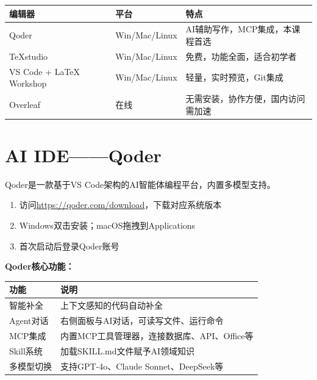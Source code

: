 \begin{table}[H]
\centering
\begin{tabular}{llp{6cm}}
\toprule
\textbf{编辑器} & \textbf{平台} & \textbf{特点} \\
\midrule
Qoder & Win/Mac/Linux & AI辅助写作，MCP集成，本课程首选 \\
TeXstudio & Win/Mac/Linux & 免费，功能全面，适合初学者 \\
VS Code + LaTeX Workshop & Win/Mac/Linux & 轻量，实时预览，Git集成 \\
Overleaf & 在线 & 无需安装，协作方便，国内访问需加速 \\
\bottomrule
\end{tabular}
\end{table}

\section{AI IDE——Qoder}

Qoder是一款基于VS Code架构的AI智能体编程平台，内置多模型支持。

\begin{enumerate}[leftmargin=2em]
  \item 访问\url{https://qoder.com/download}，下载对应系统版本
  \item Windows双击安装；macOS拖拽到Applications
  \item 首次启动后登录Qoder账号
\end{enumerate}

\textbf{Qoder核心功能：}

\begin{table}[H]
\centering
\begin{tabular}{lp{9cm}}
\toprule
\textbf{功能} & \textbf{说明} \\
\midrule
智能补全 & 上下文感知的代码自动补全 \\
Agent对话 & 右侧面板与AI对话，可读写文件、运行命令 \\
MCP集成 & 内置MCP工具管理器，连接数据库、API、Office等 \\
Skill系统 & 加载SKILL.md文件赋予AI领域知识 \\
多模型切换 & 支持GPT-4o、Claude Sonnet、DeepSeek等 \\
\bottomrule
\end{tabular}
\end{table}

